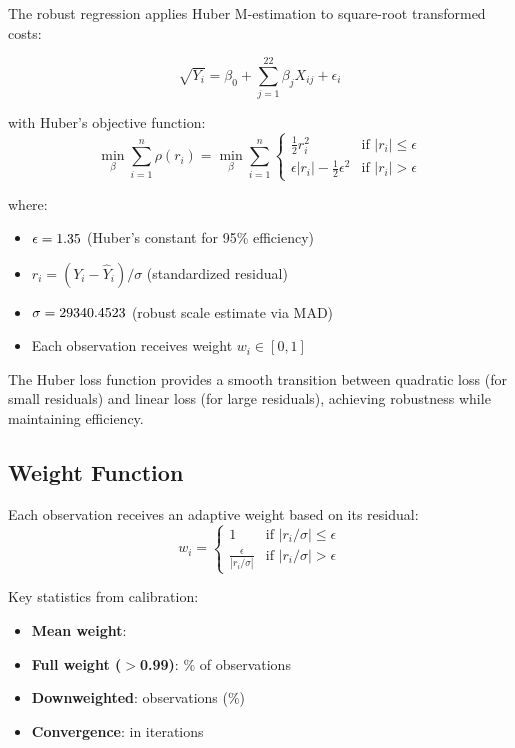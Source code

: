 The robust regression applies Huber M-estimation to square-root transformed costs:

\begin{equation}
\sqrt{Y_i} = \beta_0 + \sum_{j=1}^{22} \beta_j X_{ij} + \epsilon_i
\end{equation}

with Huber's objective function:
\begin{equation}
\min_\beta \sum_{i=1}^{n} \rho(r_i) = \min_\beta \sum_{i=1}^{n} \begin{cases}
\frac{1}{2}r_i^2 & \text{if } |r_i| \leq \epsilon \\
\epsilon|r_i| - \frac{1}{2}\epsilon^2 & \text{if } |r_i| > \epsilon
\end{cases}
\end{equation}

where:
\begin{itemize}
    \item $\epsilon = 1.35{}$ (Huber's constant for 95\% efficiency)
    \item $r_i = (Y_i - \hat{Y}_i)/\sigma$ (standardized residual)
    \item $\sigma = 29340.4523{}$ (robust scale estimate via MAD)
    \item Each observation receives weight $w_i \in [0, 1]$
\end{itemize}

The Huber loss function provides a smooth transition between quadratic loss (for small residuals) and linear loss (for large residuals), achieving robustness while maintaining efficiency.

\subsection{Weight Function}

Each observation receives an adaptive weight based on its residual:
\begin{equation}
w_i = \begin{cases}
1 & \text{if } |r_i/\sigma| \leq \epsilon \\
\frac{\epsilon}{|r_i/\sigma|} & \text{if } |r_i/\sigma| > \epsilon
\end{cases}
\end{equation}

Key statistics from calibration:
\begin{itemize}
    \item \textbf{Mean weight}: \ModelThreeMeanWeight{}
    \item \textbf{Full weight ($>$0.99)}: \ModelThreeFullWeightPct{}\% of observations
    \item \textbf{Downweighted}: \ModelThreeOutliersDetected{} observations (\ModelThreeOutlierPercentage{}\%)
    \item \textbf{Convergence}: \ModelThreeConverged{} in \ModelThreeNumIterations{} iterations
\end{itemize}

